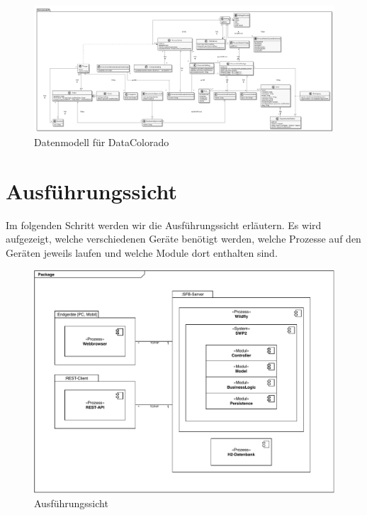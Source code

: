 \documentclass[enabledeprecatedfontcommands,fontsize=12pt,paper=a4,twoside]{scrartcl}
\begin{document}
{ \begin{figure}
   \includegraphics[width=\textwidth]{UML/datenModel}
  \caption{Datenmodell für DataColorado}
  \centering
 

 \end{figure}
\newpage
\section{Ausführungssicht}

\label{sec:ausfuehrung}


{ Im folgenden Schritt werden wir die Ausführungssicht erläutern. Es wird aufgezeigt, welche verschiedenen Geräte benötigt werden, welche Prozesse auf den Geräten jeweils laufen und welche Module dort enthalten sind.
}


\begin{figure}[H]
\includegraphics[scale=0.5]{UML/06Ausfuehrungssicht.pdf}
 \caption{Ausführungssicht}
\end{figure}


}
\end{document}
